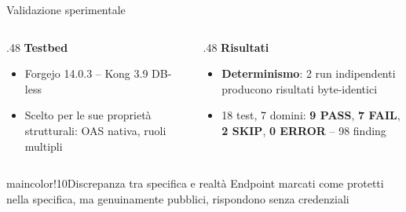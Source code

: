 
\begin{frame}{Validazione sperimentale}
  \begin{columns}
    \begin{column}{.48\textwidth}
      \textbf{Testbed}
      \begin{itemize}
        \item \alert{Forgejo} 14.0.3 -- \alert{Kong} 3.9 DB-less

        \item Scelto per le sue proprietà strutturali: \alert{OAS nativa}, ruoli multipli
      \end{itemize}
    \end{column}

    \begin{column}{.48\textwidth}
      \textbf{Risultati}
      \begin{itemize}
        \item \textbf{Determinismo}: 2 run indipendenti producono risultati \alert{byte-identici}

        \item 18 test, 7 domini: \textcolor{green!50!black}{\textbf{9 PASS}}, \textcolor{red!60!black}{\textbf{7 FAIL}}, \textcolor{orange!80!black}{\textbf{2 SKIP}}, \textcolor{violet!60!black}{\textbf{0 ERROR}} -- \alert{98 finding}
      \end{itemize}
    \end{column}
  \end{columns}

  \vspace{0.5em}
  \begin{colorblock}[black!80]{maincolor!10}{Discrepanza tra specifica e realtà}
    \small Endpoint marcati come \alert{protetti} nella specifica, ma genuinamente pubblici, rispondono \alert{senza credenziali}
  \end{colorblock}
\end{frame}